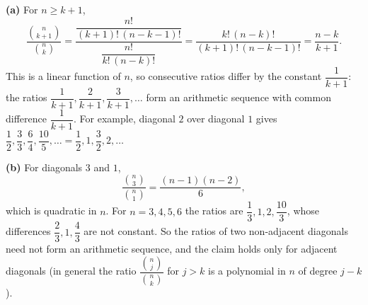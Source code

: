 \textbf{(a)} For $n\ge k+1$,
\[
\dfrac{\binom n{k+1}}{\binom nk}=\dfrac{\dfrac{n!}{(k+1)!\,(n-k-1)!}}{\dfrac{n!}{k!\,(n-k)!}}=\dfrac{k!\,(n-k)!}{(k+1)!\,(n-k-1)!}=\dfrac{n-k}{k+1}.
\]
This is a linear function of $n$, so consecutive ratios differ by the constant $\dfrac{1}{k+1}$: the ratios $\dfrac{1}{k+1},\dfrac{2}{k+1},\dfrac{3}{k+1},\dots$ form an arithmetic sequence with common difference $\boxed{\dfrac{1}{k+1}}$. For example, diagonal $2$ over diagonal $1$ gives $\dfrac{1}{2},\dfrac{3}{3},\dfrac{6}{4},\dfrac{10}{5},\dots=\dfrac{1}{2},1,\dfrac{3}{2},2,\dots$

\textbf{(b)} For diagonals $3$ and $1$,
\[
\dfrac{\binom n3}{\binom n1}=\dfrac{(n-1)(n-2)}{6},
\]
which is quadratic in $n$. For $n=3,4,5,6$ the ratios are $\dfrac{1}{3},1,2,\dfrac{10}{3}$, whose differences $\dfrac{2}{3},1,\dfrac{4}{3}$ are not constant. So the ratios of two non-adjacent diagonals need not form an arithmetic sequence, and the claim holds only for adjacent diagonals (in general the ratio $\dfrac{\binom nj}{\binom nk}$ for $j>k$ is a polynomial in $n$ of degree $j-k$).
